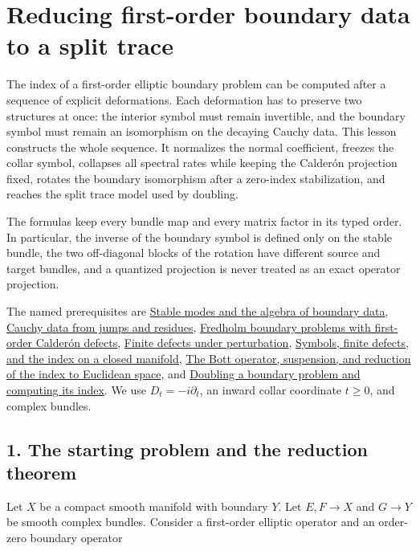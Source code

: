 \documentclass[
  11pt,
]{article}
\author{}
\date{}
\begin{document}
\section{Reducing first-order boundary data to a split
trace}\label{reducing-first-order-boundary-data-to-a-split-trace}

The index of a first-order elliptic boundary problem can be computed
after a sequence of explicit deformations. Each deformation has to
preserve two structures at once: the interior symbol must remain
invertible, and the boundary symbol must remain an isomorphism on the
decaying Cauchy data. This lesson constructs the whole sequence. It
normalizes the normal coefficient, freezes the collar symbol, collapses
all spectral rates while keeping the Calderón projection fixed, rotates
the boundary isomorphism after a zero-index stabilization, and reaches
the split trace model used by doubling.

The formulas keep every bundle map and every matrix factor in its typed
order. In particular, the inverse of the boundary symbol is defined only
on the stable bundle, the two off-diagonal blocks of the rotation have
different source and target bundles, and a quantized projection is never
treated as an exact operator projection.

The named prerequisites are \href{stable-boundary-models.pdf}{Stable
modes and the algebra of boundary data},
\href{calderon-cauchy-data.pdf}{Cauchy data from jumps and residues},
\href{generalized-collar-fredholm.pdf}{Fredholm boundary problems with
first-order Calderón defects}, \href{fredholm-stability.pdf}{Finite
defects under perturbation},
\href{global-elliptic-symbol-index.pdf}{Symbols, finite defects, and the
index on a closed manifold}, \href{bott-suspension.pdf}{The Bott
operator, suspension, and reduction of the index to Euclidean space},
and \href{split-doubling-boundary-index.pdf}{Doubling a boundary problem
and computing its index}. We use \(D_t=-i\partial_t\), an inward collar
coordinate \(t\geq0\), and complex bundles.

\subsection{1. The starting problem and the reduction
theorem}\label{the-starting-problem-and-the-reduction-theorem}

Let \(X\) be a compact smooth manifold with boundary \(Y\). Let
\(E,F\to X\) and \(G\to Y\) be smooth complex bundles. Consider a
first-order elliptic operator and an order-zero boundary operator
\end{document}
